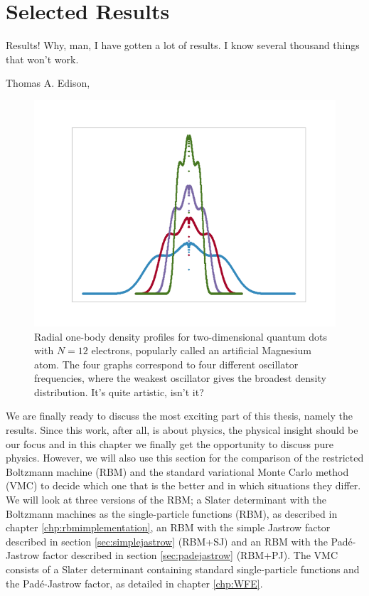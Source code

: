 \chapter{Selected Results} \label{chp:results}
\epigraph{Results! Why, man, I have gotten a lot of results. I know several thousand things that won't work.}{Thomas A. Edison, \cite{noauthor_edisonian_nodate}}
\begin{figure}[H]
	\centering
	\includegraphics[scale=0.6]{../Images/art_white.png}
	\caption{Radial one-body density profiles for two-dimensional quantum dots with $N=12$ electrons, popularly called an artificial Magnesium atom. The four graphs correspond to four different oscillator frequencies, where the weakest oscillator gives the broadest density distribution. It's quite artistic, isn't it?}
\end{figure}

We are finally ready to discuss the most exciting part of this thesis, namely the results. Since this work, after all, is about physics, the physical insight should be our focus and in this chapter we finally get the opportunity to discuss pure physics. However, we will also use this section for the comparison of the restricted Boltzmann machine (RBM) and the standard variational Monte Carlo method (VMC) to decide which one that is the better and in which situations they differ. We will look at three versions of the RBM; a Slater determinant with the Boltzmann machines as the single-particle functions (RBM), as described in chapter \ref{chp:rbmimplementation}, an RBM with the simple Jastrow factor described in section \ref{sec:simplejastrow} (RBM+SJ) and an RBM with the Padé-Jastrow factor described in section \ref{sec:padejastrow} (RBM+PJ). The VMC consists of a Slater determinant containing standard single-particle functions and the Padé-Jastrow factor, as detailed in chapter \ref{chp:WFE}. 

